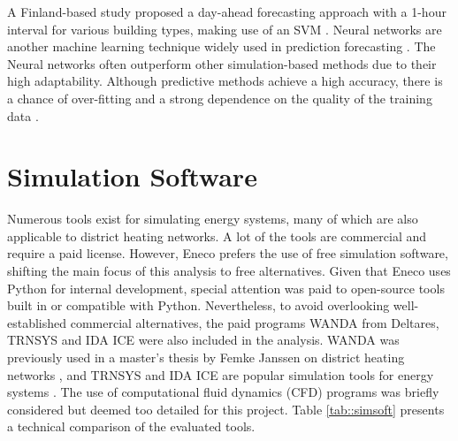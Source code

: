 A Finland-based study proposed a day-ahead forecasting approach with a 1-hour interval for various building types, making use of an SVM \cite{SVMFinland}. Neural networks are another machine learning technique widely used in prediction forecasting \cite{ZHANG199835,Hippert,FRISON2024132745}. The Neural networks often outperform other simulation-based methods due to their high adaptability. Although predictive methods achieve a high accuracy, there is a chance of over-fitting and a strong dependence on the quality of the training data \cite{Talebi}.


\section{Simulation Software}\label{sec::simsoft}
Numerous tools exist for simulating energy systems, many of which are also applicable to district heating networks. A lot of the tools are commercial and require a paid license. However, Eneco prefers the use of free simulation software, shifting the main focus of this analysis to free alternatives. Given that Eneco uses Python for internal development, special attention was paid to open-source tools built in or compatible with Python. Nevertheless, to avoid overlooking well-established commercial alternatives, the paid programs WANDA \cite{deltaresWanda} from Deltares, TRNSYS and IDA ICE \cite{IDAICe} were also included in the analysis. WANDA was previously used in a master’s thesis by Femke Janssen on district heating networks \cite{FemkeJanssenLit}, and TRNSYS and IDA ICE are popular simulation tools for energy systems \cite{KUNTUAROVA}. The use of computational fluid dynamics (CFD) programs was briefly considered but deemed too detailed for this project. Table \ref{tab::simsoft} presents a technical comparison of the evaluated tools.


